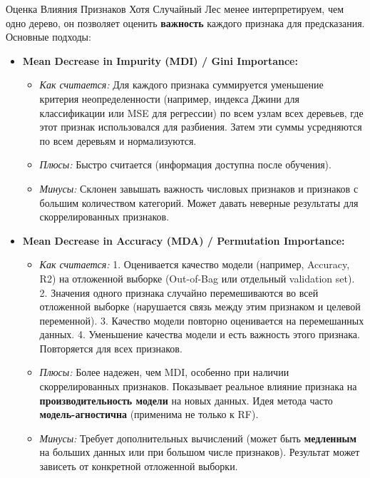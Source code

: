\begin{textbox}{Оценка Влияния Признаков}
    Хотя Случайный Лес менее интерпретируем, чем одно дерево, он позволяет оценить \textbf{важность} каждого признака для предсказания. Основные подходы:
    \begin{itemize}
        \item \textbf{Mean Decrease in Impurity (MDI) / Gini Importance:}
            \begin{itemize}
                \item \textit{Как считается:} Для каждого признака суммируется уменьшение критерия неопределенности (например, индекса Джини для классификации или MSE для регрессии) по всем узлам всех деревьев, где этот признак использовался для разбиения. Затем эти суммы усредняются по всем деревьям и нормализуются.
                \item \textit{Плюсы:} Быстро считается (информация доступна после обучения).
                \item \textit{Минусы:} Склонен завышать важность числовых признаков и признаков с большим количеством категорий. Может давать неверные результаты для скоррелированных признаков.
            \end{itemize}
        \item \textbf{Mean Decrease in Accuracy (MDA) / Permutation Importance:}
            \begin{itemize}
                \item \textit{Как считается:}
                    1. Оценивается качество модели (например, Accuracy, R2) на отложенной выборке (Out-of-Bag или отдельный validation set).
                    2. Значения одного признака случайно перемешиваются во всей отложенной выборке (нарушается связь между этим признаком и целевой переменной).
                    3. Качество модели повторно оценивается на перемешанных данных.
                    4. Уменьшение качества модели и есть важность этого признака. Повторяется для всех признаков.
                \item \textit{Плюсы:} Более надежен, чем MDI, особенно при наличии скоррелированных признаков. Показывает реальное влияние признака на \textbf{производительность модели} на новых данных. Идея метода часто \textbf{модель-агностична} (применима не только к RF).
                \item \textit{Минусы:} Требует дополнительных вычислений (может быть \textbf{медленным} на больших данных или при большом числе признаков). Результат может зависеть от конкретной отложенной выборки.
            \end{itemize}
    \end{itemize}
\end{textbox}

